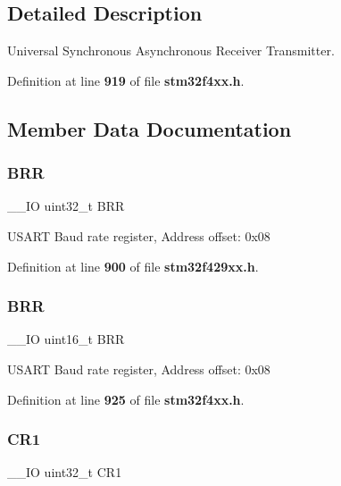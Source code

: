 \subsection{Detailed Description}
Universal Synchronous Asynchronous Receiver Transmitter. 

Definition at line \textbf{ 919} of file \textbf{ stm32f4xx.\+h}.



\subsection{Member Data Documentation}
\mbox{\label{structUSART__TypeDef_a092e59d908b2ca112e31047e942340cb}} 
\subsubsection{B\+RR\hspace{0.1cm}{\footnotesize\ttfamily [1/2]}}
{\footnotesize\ttfamily \+\_\+\+\_\+\+IO uint32\+\_\+t B\+RR}

U\+S\+A\+RT Baud rate register, Address offset\+: 0x08 

Definition at line \textbf{ 900} of file \textbf{ stm32f429xx.\+h}.

\mbox{\label{structUSART__TypeDef_af0ba3d82d524fddbe0fb3309788e2954}} 
\subsubsection{B\+RR\hspace{0.1cm}{\footnotesize\ttfamily [2/2]}}
{\footnotesize\ttfamily \+\_\+\+\_\+\+IO uint16\+\_\+t B\+RR}

U\+S\+A\+RT Baud rate register, Address offset\+: 0x08 

Definition at line \textbf{ 925} of file \textbf{ stm32f4xx.\+h}.

\mbox{\label{structUSART__TypeDef_ab0ec7102960640751d44e92ddac994f0}} 
\subsubsection{C\+R1\hspace{0.1cm}{\footnotesize\ttfamily [1/2]}}
{\footnotesize\ttfamily \+\_\+\+\_\+\+IO uint32\+\_\+t C\+R1}


